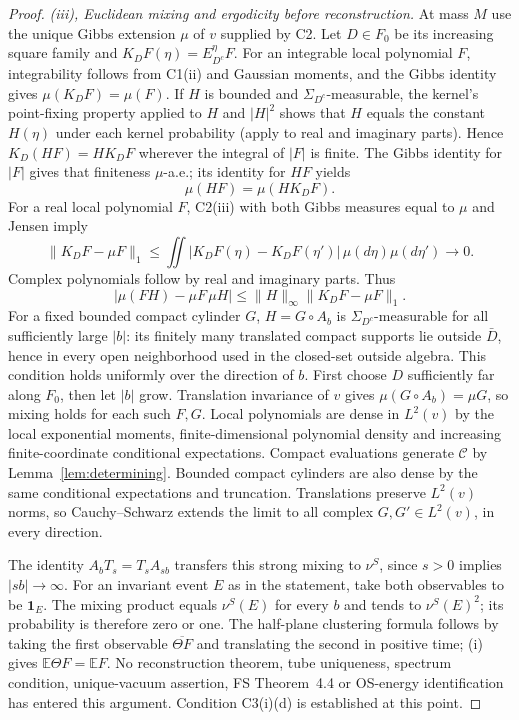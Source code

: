 \documentclass[11pt]{article}
\theoremstyle{plain}
\theoremstyle{definition}
\theoremstyle{remark}
\newcommand{\E}{\mathbb{E}}
\newcommand{\cC}{\mathcal{C}}
\newcommand{\ind}{\mathbf{1}}
\newcommand{\conj}[1]{\overline{#1}}
\begin{document}
\begin{proof}
\label{proof:CT-iii}
\emph{(iii), Euclidean mixing and ergodicity before reconstruction.}
At mass $M$ use the unique Gibbs extension $\mu$ of $v$ supplied by C2.
Let $D\in F_0$ be its increasing square family and
$K_DF(\eta)=E^\eta_{D^c}F$. For an integrable local polynomial $F$,
integrability follows from C1(ii) and Gaussian moments, and the Gibbs
identity gives $\mu(K_DF)=\mu(F)$. If $H$ is bounded and
$\Sigma_{D^c}$-measurable, the kernel's point-fixing property applied to
$H$ and $|H|^2$ shows that $H$ equals the constant $H(\eta)$ under each
kernel probability (apply to real and imaginary parts). Hence
$K_D(HF)=H K_DF$ wherever the integral of $|F|$ is finite. The Gibbs
identity for $|F|$ gives that finiteness $\mu$-a.e.; its identity for
$HF$ yields
\begin{equation}\label{eq:mixing-kernel-factor}
 \mu(HF)=\mu(HK_DF).
\end{equation}
For a real local polynomial $F$, C2(iii) with both Gibbs measures equal
to $\mu$ and Jensen imply
\begin{equation}\label{eq:mixing-kernel-L1}
 \|K_DF-\mu F\|_1
 \le\iint|K_DF(\eta)-K_DF(\eta')|\,\mu(d\eta)\mu(d\eta')\longrightarrow0.
\end{equation}
Complex polynomials follow by real and imaginary parts. Thus
\[
 |\mu(FH)-\mu F\,\mu H|\le\|H\|_\infty\|K_DF-\mu F\|_1.
\]
For a fixed bounded compact cylinder $G$, $H=G\circ A_b$ is
$\Sigma_{D^c}$-measurable for all sufficiently large $|b|$: its finitely
many translated compact supports lie outside $\bar D$, hence in every
open neighborhood used in the closed-set outside algebra. This condition
holds uniformly over the direction of $b$. First choose $D$ sufficiently
far along $F_0$, then let $|b|$ grow. Translation invariance of $v$ gives
$\mu(G\circ A_b)=\mu G$, so mixing holds for each such $F,G$.
Local polynomials are dense in $L^2(v)$ by the local exponential moments,
finite-dimensional polynomial density and increasing finite-coordinate
conditional expectations. Compact evaluations generate $\cC$ by
Lemma~\ref{lem:determining}. Bounded compact cylinders are also dense by
the same conditional expectations and truncation. Translations preserve
$L^2(v)$ norms, so Cauchy--Schwarz extends the limit to all complex
$G,G'\in L^2(v)$, in every direction.

The identity $A_bT_s=T_sA_{sb}$ transfers this strong mixing to $\nu^S$,
since $s>0$ implies $|sb|\to\infty$. For an invariant event $E$ as in
the statement, take both observables to be $\ind_E$. The mixing product
equals $\nu^S(E)$ for every $b$ and tends to $\nu^S(E)^2$; its probability
is therefore zero or one. The half-plane clustering formula follows by
taking the first observable $\conj{\Theta F}$ and translating the second
in positive time; (i) gives $\E\Theta F=\E F$.
No reconstruction theorem, tube uniqueness, spectrum condition,
unique-vacuum assertion, FS Theorem~4.4 or OS-energy identification has
entered this argument. Condition C3(i)(d) is established at this point.


\end{proof}
\end{document}

